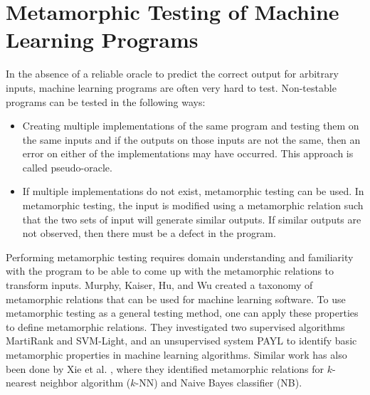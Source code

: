 \section{Metamorphic Testing of Machine Learning Programs}\label{2.4MetamorphicTestingMachineLearning}

In the absence of a reliable oracle to predict the correct output for arbitrary inputs, machine learning programs are often very hard to test. Non-testable programs can be tested in the following ways:
\begin{itemize}
  \item Creating multiple implementations of the same program and testing them on the same inputs and if the outputs on those inputs are not the same, then an error on either of the implementations may have occurred. This approach is called pseudo-oracle.
  \item If multiple implementations do not exist, metamorphic testing can be used. In metamorphic testing, the input is modified using a metamorphic relation such that the two sets of input will generate similar outputs. If similar outputs are not observed, then there must be a defect in the program.
\end{itemize}

Performing metamorphic testing requires domain understanding and familiarity with the program to be able to come up with the metamorphic relations to transform inputs. Murphy, Kaiser, Hu, and Wu \cite{Murphy2008} created a taxonomy of metamorphic relations that can be used for machine learning software. To use metamorphic testing as a general testing method, one can apply these properties to define metamorphic relations\cite{Murphy2008}. They investigated two supervised algorithms MartiRank and SVM-Light, and an unsupervised system PAYL to identify basic metamorphic properties in machine learning algorithms. Similar work has also been done by Xie et al. \cite{Xie2009}, where they identified metamorphic relations for $k$-nearest neighbor algorithm ($k$-NN) and Naive Bayes classifier (NB).

